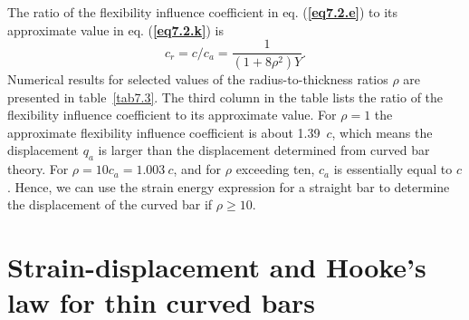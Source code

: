 \documentclass{AeroStructure-ERJohnson}
\begin{document}
\begin{example}
The ratio of the flexibility influence coefficient in eq. (\textbf{\ref{eq7.2.e}}) to its approximate value in eq. (\textbf{\ref{eq7.2.k}}) is
\begin{equation}
c_{r}=c / c_{a}=\frac{1}{\left(1+8 \rho^{2}\right) Y}. \label{eq7.2.l}\tag{l}
\end{equation}
Numerical results for selected values of the radius-to-thickness ratios $\rho$ are presented in table~\ref{tab7.3}. The third column in the table lists the ratio of the flexibility influence coefficient to its approximate value. For $\rho= 1$ the approximate flexibility influence coefficient is about 1.39~$c$, which means the displacement $q_{a}$ is larger than the displacement determined from curved bar theory. For $\rho= 10 c_{a}=1.003~c$, and for $\rho$ exceeding ten, $c_{a}$ is essentially equal to $c$. Hence, we can use the strain energy expression for a straight bar to determine the displacement of the curved bar if $\rho \geq 10$.
\end{example}

\begin{table}%
\vspace*{-6pt}
\end{table}

\section{Strain-displacement and Hooke's law for thin curved bars}\label{sec7.2}
\end{document}
